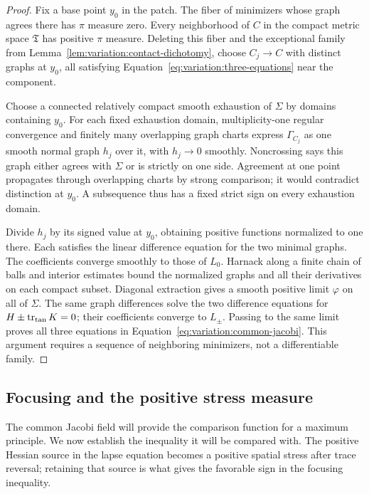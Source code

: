 \begin{proof}
Fix a base point $y_0$ in the patch.  The fiber of minimizers whose
graph agrees there has $\pi$ measure zero.  Every neighborhood of $C$
in the compact metric space $\mathfrak T$ has positive $\pi$ measure.
Deleting this fiber and the exceptional family from
Lemma~\ref{lem:variation:contact-dichotomy}, choose $C_j\to C$ with
distinct graphs at $y_0$, all satisfying
Equation~\eqref{eq:variation:three-equations} near the component.

Choose a connected relatively compact smooth exhaustion of $\Sigma$
by domains containing $y_0$.  For each fixed exhaustion domain,
multiplicity-one regular convergence and finitely many overlapping
graph charts express $\Gamma_{C_j}$ as one smooth normal graph $h_j$
over it, with $h_j\to0$ smoothly.  Noncrossing says this graph either
agrees with $\Sigma$ or is strictly on one side.  Agreement at one
point propagates through overlapping charts by strong comparison;
it would contradict distinction at $y_0$.  A subsequence thus has a
fixed strict sign on every exhaustion domain.

Divide $h_j$ by its signed value at $y_0$, obtaining positive functions
normalized to one there.  Each satisfies the linear difference
equation for the two minimal graphs.  The coefficients converge
smoothly to those of $L_0$.  Harnack along a finite chain of balls
and interior estimates bound the normalized graphs and all their
derivatives on each compact subset.  Diagonal extraction gives a
smooth positive limit $\varphi$ on all of $\Sigma$.  The same graph
differences solve the two difference equations for
$H\pm\operatorname{tr}_{\rm tan}K=0$; their coefficients converge to $L_\pm$.
Passing to the same limit proves all three equations in
Equation~\eqref{eq:variation:common-jacobi}.  This argument requires a sequence
of neighboring minimizers, not a differentiable family.
\end{proof}


\subsection{Focusing and the positive stress measure}

The common Jacobi field will provide the comparison function for a
maximum principle. We now establish the inequality it will be compared
with. The positive Hessian source in the lapse equation becomes a
positive spatial stress after trace reversal; retaining that source is
what gives the favorable sign in the focusing inequality.


